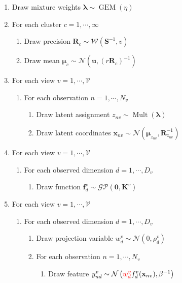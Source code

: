 \documentclass[]{article}
\newcommand{\gD}[2]{\mathcal{N}\left(#1,#2\right)}
\begin{document}
\begin{enumerate}
	\item Draw mixture weights $\boldsymbol{\lambda}\sim \operatorname{GEM}(\eta)$
	\item For each cluster $c = 1, \cdots,\infty $
	\begin{enumerate}
		\item Draw precision $\mathbf{R}_c \sim \mathcal{W}(\mathbf{S}^{-1},v)$
		\item Draw mean $\boldsymbol{\mu}_c \sim \mathcal{N}(\mathbf{u},(r\mathbf{R}_c)^{-1})$
	\end{enumerate}
	
	\item For each view $v = 1, \cdots,\mathcal{V} $
	\begin{enumerate}
		\item For each observation $n = 1,\cdots,N_v$
	\begin{enumerate}
		\item Draw latent assignment $z_{nv} \sim \operatorname{Mult}(\boldsymbol{\lambda})$
		\item Draw latent coordinates $\mathbf{x}_{nv} \sim \mathcal{N}(\boldsymbol{\mu}_{z_{nv}},\mathbf{R}_{z_{nv}}^{-1})$
	\end{enumerate}
	\end{enumerate}

	\item For each view $v = 1, \cdots,\mathcal{V} $
	\begin{enumerate}
		\item For each observed dimension $d = 1,\cdots,D_v$
		\begin{enumerate}
			\item Draw function $\mathbf{f}_{d}^{v} \sim \mathcal{GP}(\mathbf{0},\mathbf{K}^{v})$
		\end{enumerate}
	\end{enumerate}

	\item For each view $v = 1, \cdots,\mathcal{V} $
			
			
	\begin{enumerate}
		
		\item For each observed dimension $d = 1,\cdots,D_v$

		\begin{enumerate}
					\item Draw projection variable ${w}_{d}^v\sim \gD{0}{\rho_d^v}$
			\item For each observation $n = 1,\cdots,N_v$
			\begin{enumerate}
				\item Draw feature $y_{nd}^{v}\sim \gD{\textcolor{red}{{w}_{d}^v}f_d^{v}(\mathbf{x}_{nv})}{\beta^{-1}}$
			\end{enumerate}
		\end{enumerate}
	\end{enumerate}
\end{enumerate}
\end{document}
